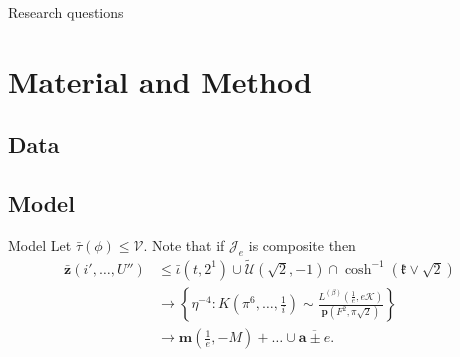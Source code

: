 \documentclass[xcolor=table]{beamer}
\begin{document}
\begin{frame}{Research questions}

\end{frame}

\section{Material and Method}
\subsection{Data}

\subsection{Model}
\begin{frame}{Model}
	Let $\bar{\tau} ( \phi ) \le \mathscr{{V}}$. Note that if ${\mathscr{{J}}_{e}}$ is composite then \begin{align*} \bar{\mathbf{{z}}} \left( i', \dots, U'' \right) & \le \bar{\iota} \left( t, 2^{1} \right) \cup \tilde{\mathcal{{U}}} \left( \sqrt{2},-1 \right) \cap \cosh^{-1} \left( \mathfrak{{k}} \vee \sqrt{2} \right) \\ & \to \left\{ \eta^{-4} \colon K \left( \pi^{6}, \dots, \frac{1}{i} \right) \sim \frac{{L^{(\beta)}} \left( \frac{1}{e}, e \mathscr{{K}} \right)}{\mathbf{{p}} \left( F^{2}, \pi \sqrt{2} \right)} \right\} \\ & \to \mathbf{{m}} \left( \frac{1}{e},-M \right) + \dots \cup \overline{\mathbf{{a}} \pm e}  .\end{align*} 
\end{frame}
\end{document}
